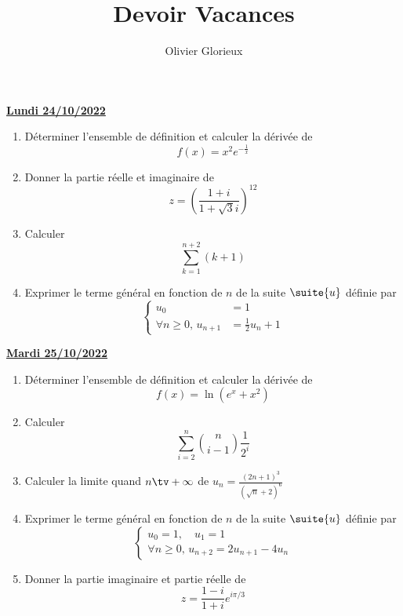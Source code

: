 \documentclass[a4paper, 11pt,reqno]{article}
\author{Olivier Glorieux}
\newcommand{\jour}[1]{
\begin{center}
\underline{\textbf{#1}}
\end{center}

 }
\begin{document}
\title{Devoir Vacances
}

\begin{center}
\underline{\textbf{Lundi 24/10/2022}}
\end{center}

\begin{exercice}
\begin{enumerate}
\item Déterminer l'ensemble de définition et calculer la dérivée de
$$f(x)=x^2e^{-\frac{1}{x}}$$
\item Donner la partie réelle et imaginaire de $$z=\left(\frac{1+i}{1+\sqrt{3}i}\right)^{12}$$
\item Calculer 
$$\sum_{k=1}^{n+2} (k+1)$$
\item Exprimer le terme général en fonction de $n$ de la suite $\suite{u}$ définie par 
$$\left\{\begin{array}{rl}
u_0 &=1\\
\forall n\geq 0,\,  u_{n+1}&= \frac{1}{2}u_n +1
\end{array}\right.$$
\end{enumerate}
\end{exercice}







\jour{Mardi 25/10/2022}
\begin{exercice}
\begin{enumerate}
\item  Déterminer l'ensemble de définition et calculer la dérivée de
$$f(x) =\ln(e^x+x^2)$$
\item Calculer $$\sum_{i=2}^n \binom{n}{i-1}\frac{1}{2^{i} }$$ 
\item Calculer la limite quand $n\tv+\infty$ de $u_n=\frac{(2n+1)^3}{(\sqrt{n}+2)^6}$
\item Exprimer le terme général en fonction de $n$ de la suite $\suite{u}$ définie par 
$$\left\{\begin{array}{l}
u_0 =1,\quad u_1=1\\
\forall n\geq 0,\,  u_{n+2}= 2u_{n+1}-4u_n
\end{array}\right.$$
\item Donner la partie imaginaire et partie réelle de 
$$z=\frac{1-i}{1+i}e^{i\pi/3}$$
\end{enumerate}
\end{exercice}
\end{document}

